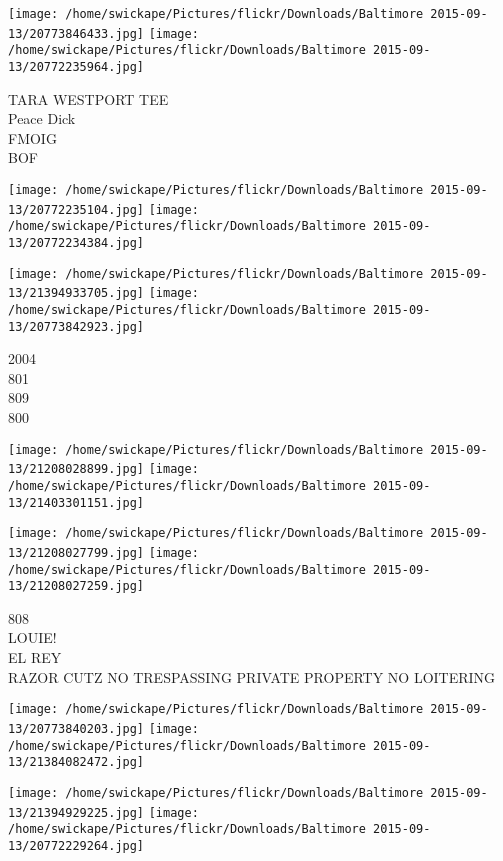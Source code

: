 \documentclass[10pt,letterpaper]{article}
\begin{document}
\texttt{[image: /home/swickape/Pictures/flickr/Downloads/Baltimore 2015-09-13/20773846433.jpg]}
\texttt{[image: /home/swickape/Pictures/flickr/Downloads/Baltimore 2015-09-13/20772235964.jpg]}

TARA WESTPORT TEE\\
Peace Dick\\
FMOIG\\
BOF\\
\pagebreak

\texttt{[image: /home/swickape/Pictures/flickr/Downloads/Baltimore 2015-09-13/20772235104.jpg]}
\texttt{[image: /home/swickape/Pictures/flickr/Downloads/Baltimore 2015-09-13/20772234384.jpg]}

\texttt{[image: /home/swickape/Pictures/flickr/Downloads/Baltimore 2015-09-13/21394933705.jpg]}
\texttt{[image: /home/swickape/Pictures/flickr/Downloads/Baltimore 2015-09-13/20773842923.jpg]}

2004\\
801\\
809\\
800\\
\pagebreak

\texttt{[image: /home/swickape/Pictures/flickr/Downloads/Baltimore 2015-09-13/21208028899.jpg]}
\texttt{[image: /home/swickape/Pictures/flickr/Downloads/Baltimore 2015-09-13/21403301151.jpg]}

\texttt{[image: /home/swickape/Pictures/flickr/Downloads/Baltimore 2015-09-13/21208027799.jpg]}
\texttt{[image: /home/swickape/Pictures/flickr/Downloads/Baltimore 2015-09-13/21208027259.jpg]}

808\\
LOUIE!\\
EL REY\\
RAZOR CUTZ NO TRESPASSING PRIVATE PROPERTY NO LOITERING\\
\pagebreak

\texttt{[image: /home/swickape/Pictures/flickr/Downloads/Baltimore 2015-09-13/20773840203.jpg]}
\texttt{[image: /home/swickape/Pictures/flickr/Downloads/Baltimore 2015-09-13/21384082472.jpg]}

\texttt{[image: /home/swickape/Pictures/flickr/Downloads/Baltimore 2015-09-13/21394929225.jpg]}
\texttt{[image: /home/swickape/Pictures/flickr/Downloads/Baltimore 2015-09-13/20772229264.jpg]}
\end{document}
